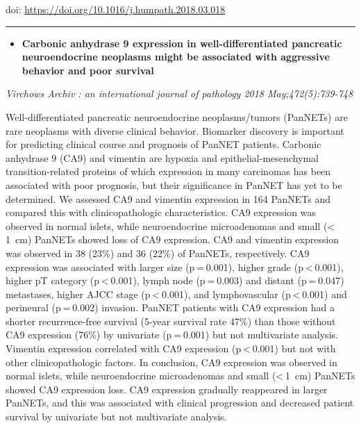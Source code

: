 \documentclass[]{article}
\providecommand{\tightlist}{%
  \setlength{\itemsep}{0pt}\setlength{\parskip}{0pt}}
\begin{document}
doi: \url{https://doi.org/10.1016/j.humpath.2018.03.018}

{}

{}

\begin{center}\rule{0.5\linewidth}{\linethickness}\end{center}

\begin{itemize}
\tightlist
\item
  \textbf{Carbonic anhydrase 9 expression in well-differentiated
  pancreatic neuroendocrine neoplasms might be associated with
  aggressive behavior and poor survival}
\end{itemize}

\emph{Virchows Archiv : an international journal of pathology 2018
May;472(5):739-748}

Well-differentiated pancreatic neuroendocrine neoplasms/tumors (PanNETs)
are rare neoplasms with diverse clinical behavior. Biomarker discovery
is important for predicting clinical course and prognosis of PanNET
patients. Carbonic anhydrase 9 (CA9) and vimentin are hypoxia and
epithelial-mesenchymal transition-related proteins of which expression
in many carcinomas has been associated with poor prognosis, but their
significance in PanNET has yet to be determined. We assessed CA9 and
vimentin expression in 164 PanNETs and compared this with
clinicopathologic characteristics. CA9 expression was observed in normal
islets, while neuroendocrine microadenomas and small (\textless{} 1~cm)
PanNETs showed loss of CA9 expression. CA9 and vimentin expression was
observed in 38 (23\%) and 36 (22\%) of PanNETs, respectively. CA9
expression was associated with larger size (p = 0.001), higher grade
(p \textless{} 0.001), higher pT category (p \textless{} 0.001), lymph
node (p = 0.003) and distant (p = 0.047) metastases, higher AJCC stage
(p \textless{} 0.001), and lymphovascular (p \textless{} 0.001) and
perineural (p = 0.002) invasion. PanNET patients with CA9 expression had
a shorter recurrence-free survival (5-year survival rate 47\%) than
those without CA9 expression (76\%) by univariate (p = 0.001) but not
multivariate analysis. Vimentin expression correlated with CA9
expression (p \textless{} 0.001) but not with other clinicopathologic
factors. In conclusion, CA9 expression was observed in normal islets,
while neuroendocrine microadenomas and small (\textless{} 1~cm) PanNETs
showed CA9 expression loss. CA9 expression gradually reappeared in
larger PanNETs, and this was associated with clinical progression and
decreased patient survival by univariate but not multivariate analysis.
\end{document}
